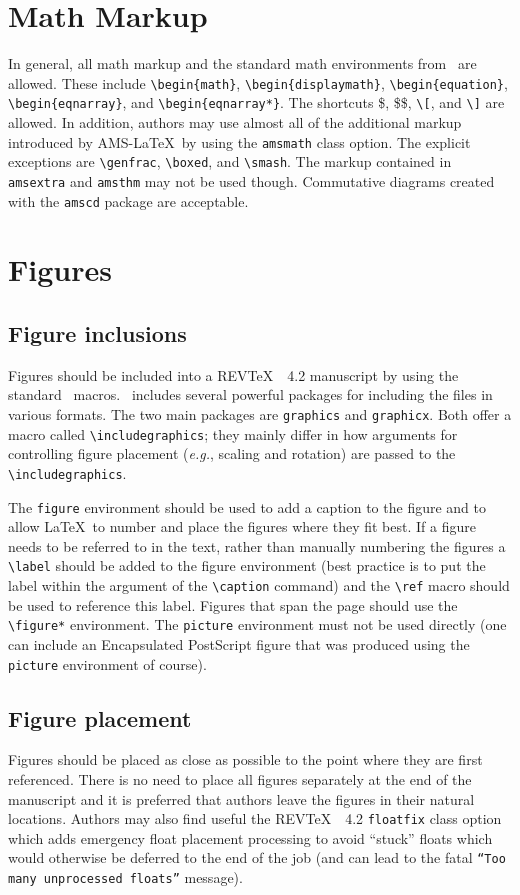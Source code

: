 \documentclass[twocolumn,secnumarabic,amssymb, nobibnotes, aps, prd]{revtex4-2}
\newcommand{\revtex}{REV\TeX\ }
\newcommand{\classoption}[1]{\texttt{#1}}
\newcommand{\macro}[1]{\texttt{\textbackslash#1}}
\newcommand{\m}[1]{\macro{#1}}
\newcommand{\env}[1]{\texttt{#1}}
\begin{document}
\section{Math Markup}
In general, all math markup and the standard math environments from
\LaTeXe\ are allowed. These include \m{begin\{math\}},
\m{begin\{displaymath\}}, \m{begin\{equation\}},
\m{begin\{eqnarray\}}, and \m{begin\{eqnarray*\}}. The shortcuts \$,
\$\$, \m{[}, and \m{]} are allowed. In addition, authors may use
almost all of the additional markup introduced by AMS-\LaTeX\ by using
the \classoption{amsmath} class option. The explicit exceptions are
\m{genfrac}, \m{boxed}, and \m{smash}. The markup contained in
\texttt{amsextra} and \texttt{amsthm} may not be used
though. Commutative diagrams created with the \texttt{amscd} package
are acceptable.

\section{Figures}
\subsection{Figure inclusions}
Figures should be included into a \revtex~4.2 manuscript by using the
standard \LaTeXe\ macros. \LaTeXe\ includes
several powerful packages for including the files in various
formats. The two main packages are \texttt{graphics} and
\texttt{graphicx}. Both offer a macro called
\m{includegraphics};
they mainly differ in how arguments for
controlling figure placement (\textit{e.g.}, scaling and rotation)
are passed to the \m{includegraphics}.

The \env{figure} environment should be used to add a caption to the
figure and to allow \LaTeX\ to number and place the figures where they
fit best.  If a figure needs to be referred to in the text,
rather than manually numbering the figures a \m{label} should be added
to the figure environment (best practice is to put the label within
the argument of the \m{caption} command) and the \m{ref} macro should be used to
reference this label. Figures that span the page should use the
\m{figure*} environment. The \env{picture} environment must not be
used directly (one can include an Encapsulated PostScript figure that
was produced using the \env{picture} environment of course).

\subsection{\label{sec:figplace}Figure placement}
Figures should be placed as close as possible to the point where they are first
referenced. There is no need to place all figures
separately at the end of the manuscript and it is preferred that
authors leave the figures in their natural locations. Authors may
also find useful the \revtex~4.2 \classoption{floatfix} class option
which adds emergency float placement processing to avoid ``stuck''
floats which would otherwise be deferred to the end of the job (and
can lead to the fatal \texttt{``Too many unprocessed floats''}
message).
\end{document}
